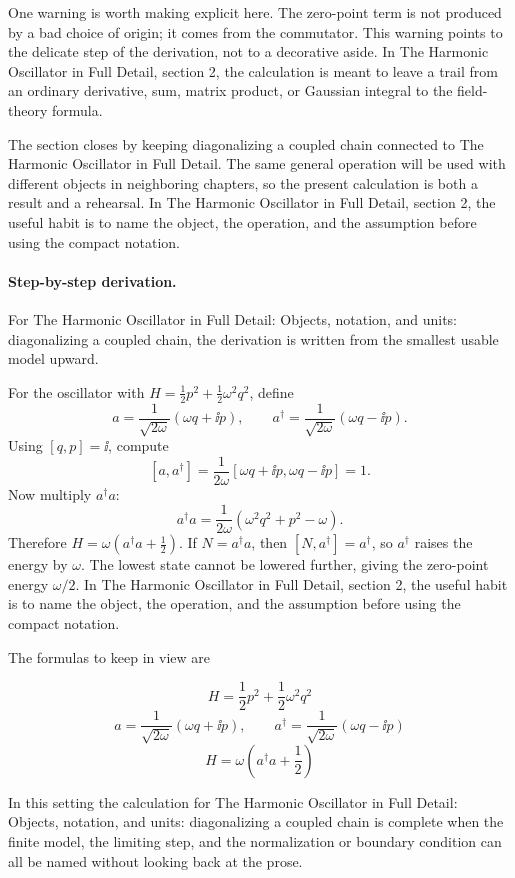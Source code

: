 One warning is worth making explicit here.  The zero-point term is not produced by a bad choice of origin; it comes from the commutator.  This warning points to the delicate step of the derivation, not to a decorative aside.  In The Harmonic Oscillator in Full Detail, section 2, the calculation is meant to leave a trail from an ordinary derivative, sum, matrix product, or Gaussian integral to the field-theory formula.

The section closes by keeping diagonalizing a coupled chain connected to The Harmonic Oscillator in Full Detail.  The same general operation will be used with different objects in neighboring chapters, so the present calculation is both a result and a rehearsal.  In The Harmonic Oscillator in Full Detail, section 2, the useful habit is to name the object, the operation, and the assumption before using the compact notation.



\paragraph{Step-by-step derivation.}

For The Harmonic Oscillator in Full Detail: Objects, notation, and units: diagonalizing a coupled chain, the derivation is written from the smallest usable model upward.

For the oscillator with \(H=\frac12p^2+\frac12\omega^2q^2\), define
\[
  a=\frac{1}{\sqrt{2\omega}}(\omega q+\ii p),\qquad
  a^\dagger=\frac{1}{\sqrt{2\omega}}(\omega q-\ii p).
\]
Using \([q,p]=\ii\), compute
\[
  [a,a^\dagger]
  =
  \frac{1}{2\omega}[\omega q+\ii p,\omega q-\ii p]=1.
\]
Now multiply \(a^\dagger a\):
\[
  a^\dagger a=\frac{1}{2\omega}(\omega^2q^2+p^2-\omega).
\]
Therefore \(H=\omega(a^\dagger a+\frac12)\).  If \(N=a^\dagger a\), then \([N,a^\dagger]=a^\dagger\), so \(a^\dagger\) raises the energy by \(\omega\).  The lowest state cannot be lowered further, giving the zero-point energy \(\omega/2\).  In The Harmonic Oscillator in Full Detail, section 2, the useful habit is to name the object, the operation, and the assumption before using the compact notation.

The formulas to keep in view are

\[
  H=\frac12p^2+\frac12\omega^2q^2
\]
\[
  a=\frac{1}{\sqrt{2\omega}}(\omega q+\ii p),\qquad a^\dagger=\frac{1}{\sqrt{2\omega}}(\omega q-\ii p)
\]
\[
  H=\omega\left(a^\dagger a+\frac12\right)
\]

In this setting the calculation for The Harmonic Oscillator in Full Detail: Objects, notation, and units: diagonalizing a coupled chain is complete when the finite model, the limiting step, and the normalization or boundary condition can all be named without looking back at the prose.




